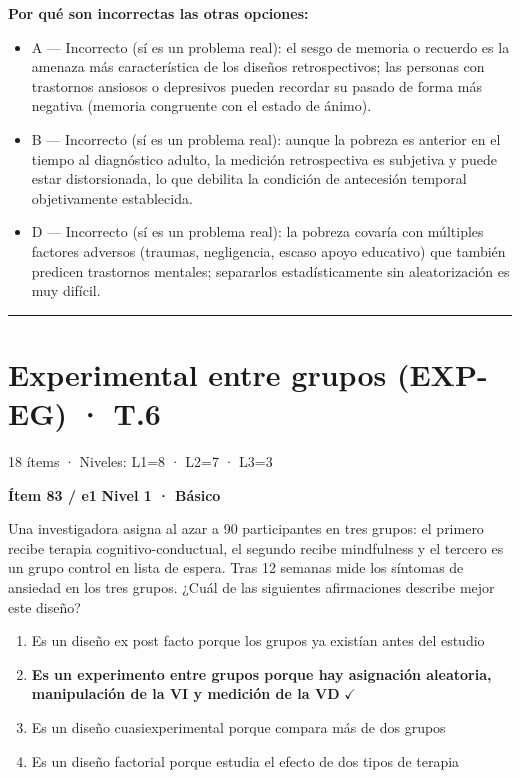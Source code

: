 \documentclass[12pt,a4paper]{article}
\begin{document}
\noindent\textbf{\color{gris}Por qué son incorrectas las otras opciones:}
\begin{itemize}
  \item {\small A — Incorrecto (sí es un problema real): el sesgo de memoria o recuerdo es la amenaza más característica de los diseños retrospectivos; las personas con trastornos ansiosos o depresivos pueden recordar su pasado de forma más negativa (memoria congruente con el estado de ánimo).}
  \item {\small B — Incorrecto (sí es un problema real): aunque la pobreza es anterior en el tiempo al diagnóstico adulto, la medición retrospectiva es subjetiva y puede estar distorsionada, lo que debilita la condición de antecesión temporal objetivamente establecida.}
  \item {\small D — Incorrecto (sí es un problema real): la pobreza covaría con múltiples factores adversos (traumas, negligencia, escaso apoyo educativo) que también predicen trastornos mentales; separarlos estadísticamente sin aleatorización es muy difícil.}
\end{itemize}
\vspace{8pt}\hrule\vspace{10pt}

\section{Experimental entre grupos (EXP-EG) · T.6}
{\small\color{gris} 18 ítems · Niveles: L1=8 · L2=7 · L3=3}

\begin{mdframed}[backgroundcolor=fondogris,linecolor=azul,linewidth=1pt,innerleftmargin=10pt,innerrightmargin=10pt,innertopmargin=7pt,innerbottommargin=7pt]
\textbf{Ítem 83 / e1} \hfill {\small\bfseries\color{azul} Nivel 1 · Básico}
\end{mdframed}

Una investigadora asigna al azar a 90 participantes en tres grupos: el primero recibe terapia cognitivo-conductual, el segundo recibe mindfulness y el tercero es un grupo control en lista de espera. Tras 12 semanas mide los síntomas de ansiedad en los tres grupos. ¿Cuál de las siguientes afirmaciones describe mejor este diseño?

\begin{enumerate}
  \item[A.] Es un diseño ex post facto porque los grupos ya existían antes del estudio
  \item[\textbf{\color{verde}B.}] \textbf{\color{verde} Es un experimento entre grupos porque hay asignación aleatoria, manipulación de la VI y medición de la VD} \hfill $\checkmark$
  \item[C.] Es un diseño cuasiexperimental porque compara más de dos grupos
  \item[D.] Es un diseño factorial porque estudia el efecto de dos tipos de terapia
\end{enumerate}
\end{document}

